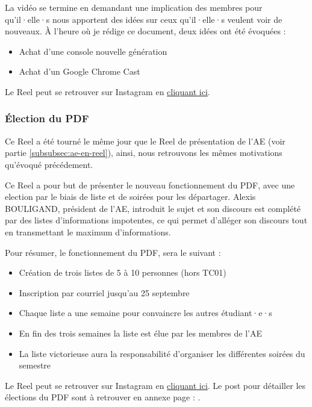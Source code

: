 La vidéo se termine en demandant une implication des membres pour qu'il·elle·s nous apportent des idées sur ceux qu'il·elle·s veulent voir de nouveaux.
À l'heure où je rédige ce document, deux idées ont été évoquées :
\begin{itemize}
    \item Achat d'une console nouvelle génération
    \item Achat d'un Google Chrome Cast
\end{itemize}

Le Reel peut se retrouver sur Instagram en \href{https://www.instagram.com/reel/CxGShAusxDq/?utm_source=ig_web_copy_link&igshid=MzRlODBiNWFlZA==}{cliquant ici}.


\subsubsection{Élection du \gls{PDF}}\label{subsubsec:election-pdf}


Ce Reel a été tourné le même jour que le Reel de présentation de l'AE (voir partie \ref{subsubsec:ae-en-reel}), ainsi, nous retrouvons les mêmes motivations qu'évoqué précédement.

Ce Reel a pour but de présenter le nouveau fonctionnement du \gls{PDF}, avec une election par le biais de liste et de soirées pour les départager.
Alexis BOULIGAND, président de l'\gls{AE}, introduit le sujet et son discours est complété par des listes d'informations impotentes, ce qui permet d'alléger son discours tout en transmettant le maximum d'informations.

Pour résumer, le fonctionnement du \gls{PDF}, sera le suivant :
\begin{itemize}
    \item Création de trois listes de 5 à 10 personnes (hors TC01)
    \item Inscription par courriel jusqu'au 25 septembre
    \item Chaque liste a une semaine pour convaincre les autres étudiant·e·s
    \item En fin des trois semaines la liste est élue par les membres de l'\gls{AE}
    \item La liste victorieuse aura la responsabilité d'organiser les différentes soirées du semestre
\end{itemize}

Le Reel peut se retrouver sur Instagram en \href{https://www.instagram.com/reel/CxQtgEXMqon/?utm_source=ig_web_copy_link&igshid=MzRlODBiNWFlZA==}{cliquant ici}.
Le post pour détailler les élections du \gls{PDF} sont à retrouver en annexe page : \pageref{subsec:interface-instagram}.

